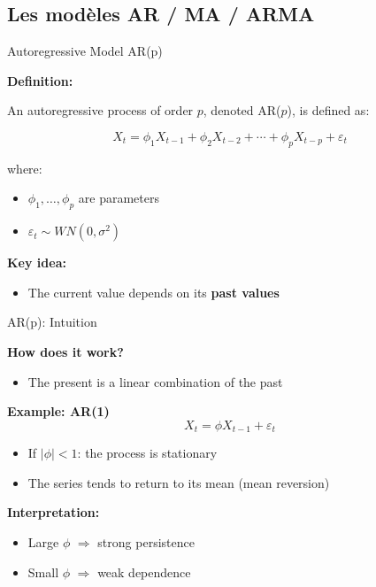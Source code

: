 \documentclass[aspectratio=169]{beamer}
\begin{document}
\subsection{Les modèles AR / MA / ARMA}
\begin{frame}{Autoregressive Model AR(p)}

\textbf{Definition:}

\vspace{0.3cm}

An autoregressive process of order $p$, denoted AR($p$), is defined as:

\[
X_t = \phi_1 X_{t-1} + \phi_2 X_{t-2} + \cdots + \phi_p X_{t-p} + \varepsilon_t
\]

\vspace{0.3cm}

where:
\begin{itemize}
    \item $\phi_1, \dots, \phi_p$ are parameters
    \item $\varepsilon_t \sim WN(0,\sigma^2)$
\end{itemize}

\vspace{0.4cm}

\textbf{Key idea:}
\begin{itemize}
    \item The current value depends on its \textbf{past values}
\end{itemize}

\end{frame}

\begin{frame}{AR(p): Intuition}

\textbf{How does it work?}

\begin{itemize}
    \item The present is a linear combination of the past
\end{itemize}

\vspace{0.4cm}

\textbf{Example: AR(1)}
\[
X_t = \phi X_{t-1} + \varepsilon_t
\]

\begin{itemize}
    \item If $|\phi| < 1$: the process is stationary
    \item The series tends to return to its mean (mean reversion)
\end{itemize}

\vspace{0.4cm}

\textbf{Interpretation:}
\begin{itemize}
    \item Large $\phi$ $\Rightarrow$ strong persistence
    \item Small $\phi$ $\Rightarrow$ weak dependence
\end{itemize}

\end{frame}
\end{document}
